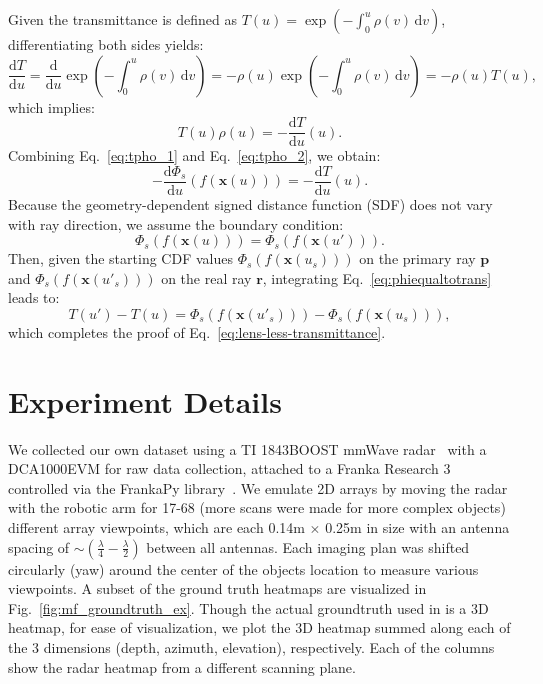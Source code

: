 Given the transmittance is defined as \( T(u) = \exp\left(-\int_0^u \rho(v)\, \mathrm{d}v\right) \), differentiating both sides yields:
\[
\frac{\mathrm{d}T}{\mathrm{d}u} = \frac{\mathrm{d}}{\mathrm{d}u} \exp\left(-\int_0^u \rho(v)\, \mathrm{d}v\right) = -\rho(u) \exp\left(-\int_0^u \rho(v)\, \mathrm{d}v\right) = -\rho(u) T(u),
\]
which implies:
\begin{equation}
\label{eq:tpho_2}
    T(u)\rho(u) = -\frac{\mathrm{d}T}{\mathrm{d}u}(u).
\end{equation}
Combining Eq.~\ref{eq:tpho_1} and Eq.~\ref{eq:tpho_2}, we obtain:
\begin{equation}
\label{eq:phiequaltotrans}
    -\frac{\mathrm{d}\Phi_s}{\mathrm{d}u}(f(\mathbf{x}(u))) = -\frac{\mathrm{d}T}{\mathrm{d}u}(u).
\end{equation}
Because the geometry-dependent signed distance function (SDF) does not vary with ray direction, we assume the boundary condition:
\[
\Phi_s(f(\mathbf{x}(u))) = \Phi_s(f(\mathbf{x}(u'))).
\]
Then, given the starting CDF values \( \Phi_s(f(\mathbf{x}(u_s))) \) on the primary ray \( \mathbf{p} \) and \( \Phi_s(f(\mathbf{x}(u'_s))) \) on the real ray \( \mathbf{r} \), integrating Eq.~\ref{eq:phiequaltotrans} leads to:
\begin{equation}
    T(u') - T(u) = \Phi_s(f(\mathbf{x}(u'_s))) - \Phi_s(f(\mathbf{x}(u_s))),
\end{equation}
which completes the proof of Eq.~\ref{eq:lens-less-transmittance}.


\section{Experiment Details}
\label{sec:radar-implementation}
 We collected our own dataset using a TI 1843BOOST mmWave radar~\cite{ti1843} with a DCA1000EVM for raw data collection, attached to a Franka Research 3 controlled via the FrankaPy library~\cite{frankapy}. We emulate 2D arrays by moving the radar with the robotic arm for 17-68 (more scans were made for more complex objects) different array viewpoints, which are each 0.14m $\times$ 0.25m in size with an antenna spacing of $\sim (\frac{\lambda}{4} - \frac{\lambda}{2})$ between all antennas. Each imaging plan was shifted circularly (yaw) around the center of the objects location to measure various viewpoints.
A subset of the ground truth heatmaps are visualized in Fig.~\ref{fig:mf_groundtruth_ex}. Though the actual groundtruth used in \name{} is a 3D heatmap, for ease of visualization, we plot the 3D heatmap summed along each of the 3 dimensions (depth, azimuth, elevation), respectively. Each of the columns show the radar heatmap from a different scanning plane.

